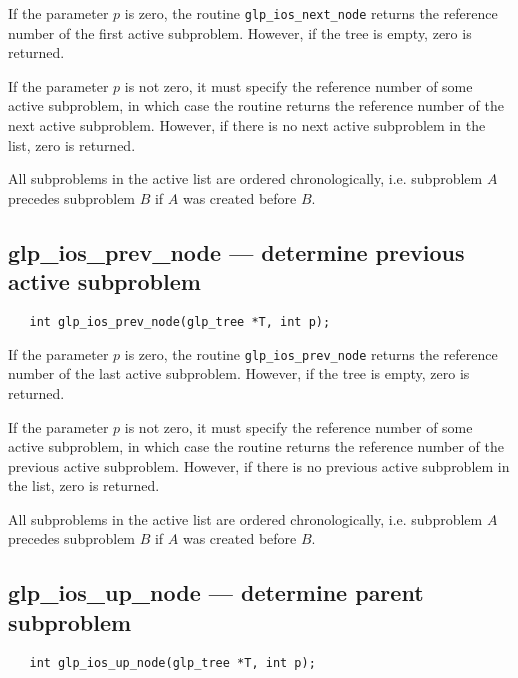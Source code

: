 \returns

If the parameter $p$ is zero, the routine \verb|glp_ios_next_node|
returns the reference number of the first active subproblem. However,
if the tree is empty, zero is returned.

If the parameter $p$ is not zero, it must specify the reference number
of some active subproblem, in which case the routine returns the
reference number of the next active subproblem. However, if there is
no next active subproblem in the list, zero is returned.

All subproblems in the active list are ordered chronologically, i.e.
subproblem $A$ precedes subproblem $B$ if $A$ was created before $B$.

\newpage

\subsection{glp\_ios\_prev\_node --- determine previous active
subproblem}

\synopsis

\begin{verbatim}
   int glp_ios_prev_node(glp_tree *T, int p);
\end{verbatim}

\returns

If the parameter $p$ is zero, the routine \verb|glp_ios_prev_node|
returns the reference number of the last active subproblem. However, if
the tree is empty, zero is returned.

If the parameter $p$ is not zero, it must specify the reference number
of some active subproblem, in which case the routine returns the
reference number of the previous active subproblem. However, if there
is no previous active subproblem in the list, zero is returned.

All subproblems in the active list are ordered chronologically, i.e.
subproblem $A$ precedes subproblem $B$ if $A$ was created before $B$.

\subsection{glp\_ios\_up\_node --- determine parent subproblem}

\synopsis

\begin{verbatim}
   int glp_ios_up_node(glp_tree *T, int p);
\end{verbatim}

\returns

